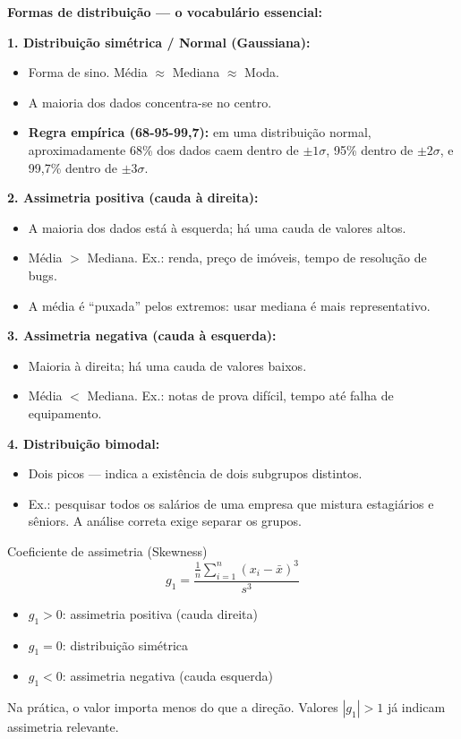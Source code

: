 \begin{SolvedBox}
\textbf{Formas de distribuição — o vocabulário essencial:}

\textbf{1. Distribuição simétrica / Normal (Gaussiana):}
\begin{itemize}
  \item Forma de sino. Média $\approx$ Mediana $\approx$ Moda.
  \item A maioria dos dados concentra-se no centro.
  \item \textbf{Regra empírica (68-95-99,7):} em uma distribuição normal,
  aproximadamente 68\% dos dados caem dentro de $\pm 1\sigma$, 95\% dentro
  de $\pm 2\sigma$, e 99,7\% dentro de $\pm 3\sigma$.
\end{itemize}

\textbf{2. Assimetria positiva (cauda à direita):}
\begin{itemize}
  \item A maioria dos dados está à esquerda; há uma cauda de valores altos.
  \item Média $>$ Mediana. Ex.: renda, preço de imóveis, tempo de resolução de bugs.
  \item A média é ``puxada'' pelos extremos: usar mediana é mais representativo.
\end{itemize}

\textbf{3. Assimetria negativa (cauda à esquerda):}
\begin{itemize}
  \item Maioria à direita; há uma cauda de valores baixos.
  \item Média $<$ Mediana. Ex.: notas de prova difícil, tempo até falha de equipamento.
\end{itemize}

\textbf{4. Distribuição bimodal:}
\begin{itemize}
  \item Dois picos — indica a existência de dois subgrupos distintos.
  \item Ex.: pesquisar todos os salários de uma empresa que mistura estagiários
  e sêniors. A análise correta exige separar os grupos.
\end{itemize}
\end{SolvedBox}

\begin{FormulaBox}{Coeficiente de assimetria (Skewness)}
\[
g_1 = \frac{\frac{1}{n}\sum_{i=1}^{n}(x_i - \bar{x})^3}{s^3}
\]
\begin{itemize}
  \item $g_1 > 0$: assimetria positiva (cauda direita)
  \item $g_1 = 0$: distribuição simétrica
  \item $g_1 < 0$: assimetria negativa (cauda esquerda)
\end{itemize}
Na prática, o valor importa menos do que a direção. Valores $|g_1| > 1$
já indicam assimetria relevante.
\end{FormulaBox}

